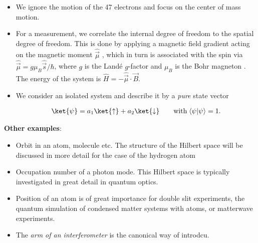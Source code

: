 \begin{itemize}
						\item 	We ignore the motion of the 47 electrons and focus on the center of mass motion.
						\item 	For a measurement, we correlate the internal degree of freedom to the spatial degree of freedom. This is done by applying a magnetic field gradient acting on the magnetic moment $\hat{\vec{\mu}}$ , which in turn is associated with the spin via $\hat{\vec{\mu}} = g \mu_B \hat{\vec{s}}/\hbar$, where $g$ is the Landé $g$-factor  and $\mu_B$ is the Bohr magneton . The energy of the system is $\hat{H} = -\hat{\vec{\mu}} \cdot \vec{B}$.
						\item 	We consider an isolated system and describe it by a \emph{pure} state vector

\begin{align}
	\ket{\psi} = a_1 \ket{\uparrow} + a_2 \ket{\downarrow}  \qquad \text{with} \; \langle\psi | \psi\rangle = 1.
\end{align}
\end{itemize}
\textbf{Other examples}:
\begin{itemize}
\item Orbit in an atom, molecule etc. The structure of the Hilbert space will be discussed in more detail for the case of the hydrogen atom
\item Occupation number of a photon mode. This Hilbert space is typically investigated in great detail in quantum optics.
\item Position of an atom is of great importance for double slit experiments, the quantum simulation of condensed matter systems with atoms,  or matterwave experiments.
\item The \textit{arm of an interferometer} is the canonical way of introdcu.
\end{itemize}

